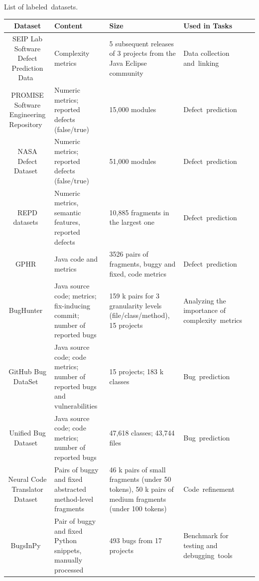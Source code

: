 \documentclass[mathematics,review,accept,moreauthors,pdftex]{Definitions/mdpi}
\begin{document}
\nointerlineskip
\begin{specialtable}[H] \widetable
\caption{List of labeled~datasets.\label{t2}}
\begin{tabulary}{\textwidth}{CLLLl}
\toprule
\textbf{Dataset}	& \textbf{Content}	& \textbf{Size}  & \parbox{10em}{\textbf{Used in Tasks}}\\
\midrule
SEIP Lab Software Defect Prediction Data~\cite{mauvsa2016systematic} & Complexity metrics & 5 subsequent releases of 3 projects from the   Java Eclipse community & Data collection and~linking \\
PROMISE Software Engineering Repository~\cite{sayyad2005promise} & Numeric metrics; reported defects (false/true) & 15,000 modules & Defect~prediction \\
NASA Defect Dataset~\cite{shepperd2018nasa} & Numeric metrics; reported defects (false/true) & 51,000 modules & Defect~prediction \\
REPD datasets~\cite{AfricEtAl2020} & Numeric metrics, semantic features, reported defects & 10,885 fragments in the largest one & Defect~prediction \\
GPHR~\cite{XuWangAi2020} & Java code and metrics & 3526 pairs of fragments, buggy and fixed, code metrics & Defect~prediction \\
BugHunter~\cite{FerencEtAl2020} & Java source code; metrics; fix-inducing commit; number of reported bugs & 159 k pairs for 3 granularity levels (file/class/method), 15 projects & Analyzing the importance of complexity~metrics \\
GitHub Bug DataSet~\cite{ferenc2016github_bug} & Java source code; code metrics; number of reported bugs and vulnerabilities & 15 projects; 183 k classes & Bug~prediction \\
Unified Bug Dataset~\cite{ferenc2020public} & Java source code; code metrics; number of reported bugs & 47,618 classes; 43,744 files & Bug~prediction \\
Neural Code Translator Dataset~\cite{TufanoEtAl2018} & Pairs of buggy and fixed abstracted method-level fragments & 46 k pairs of small fragments (under 50 tokens), 50 k pairs of medium fragments (under 100 tokens) & Code~refinement \\
BugsInPy~\cite{WidyasariEtAl2020} & Pair of buggy and fixed Python snippets, manually processed & 493 bugs from 17 projects & Benchmark for testing and debugging~tools \\


\end{tabulary}
\end{specialtable}
\end{document}
